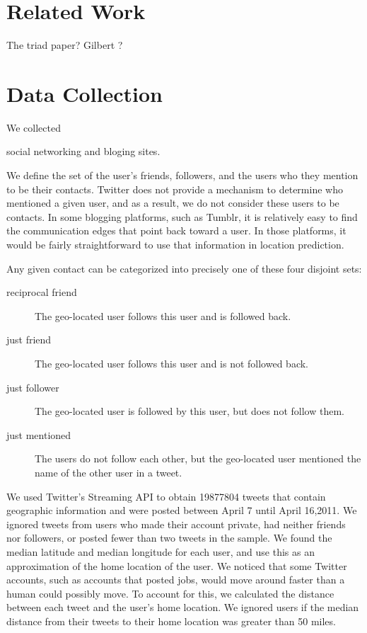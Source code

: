 \documentclass{sig-alternate}
\begin{document}
\section{Related Work}
\cite{scellato2011socio}
\cite{scellato2010distance}
\cite{backstrom2010find}
\cite{cheng2010you}
\cite{backstrom2008spatial}
\cite{gilbert2009predicting}
\cite{cranshaw2010bridging}
\cite{java2007we}
The triad paper?
Gilbert ?


\section{Data Collection}
We collected 

social networking and bloging sites.

We define the set of the user's friends, followers, and the users who they mention to be their contacts.
Twitter does not provide a mechanism to determine who mentioned a given user, and as a result, we do not consider these users to be contacts.
In some blogging platforms, such as Tumblr, it is relatively easy to find the communication edges that point back toward a user.
In those platforms, it would be fairly straightforward to use that information in location prediction.

Any given contact can be categorized into precisely one of these four disjoint sets:
\begin{description}
\item[reciprocal friend] The geo-located user follows this user and is followed back.
\item[just friend] The geo-located user follows this user and is not followed back.
\item[just follower]The geo-located user is followed by this user, but does not follow them.
\item[just mentioned] The users do not follow each other, but the geo-located user mentioned the name of the other user in a tweet.
\end{description}

We used Twitter's Streaming API to obtain 19877804 tweets that contain
geographic information and were posted between April 7 until April 16,2011.
We ignored tweets from users who made their account private, had neither
friends nor followers, or posted fewer than two tweets in the sample.
We found the median latitude and median longitude for each user, and use this
as an approximation of the home location of the user.
We noticed that some Twitter accounts, such as accounts that posted jobs, would
move around faster than a human could possibly move. To account for this, we
calculated the distance between each tweet and the user's home location. We
ignored users if the median distance from their tweets to their home location
was greater than 50 miles.
\end{document}
